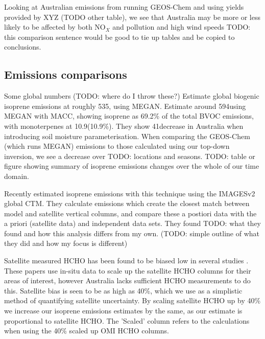         Looking at Australian emissions from running GEOS-Chem and using yields provided by XYZ (TODO other table), we see that Australia may be more or less likely to be affected by both NO$_X$ and pollution and high wind speeds TODO: this comparison sentence would be good to tie up tables and be copied to conclusions.
        
  \subsection{Emissions comparisons}
    \label{BioIsop:Results:Emissions}
  
    Some global numbers (TODO: where do I throw these?)
    \textcite{Guenther2012} Estimate global biogenic isoprene emissions at roughly 535\tgpyr, using MEGAN.
    \textcite{Sindelarova2014} Estimate around 594\tgpyr using MEGAN with MACC, showing isoprene as 69.2\% of the total BVOC emissions, with monoterpenes at 10.9\tgpyr (10.9\%).
    They show 41\tgpyr decrease in Australia when introducing soil moisture parameterisation.
    When comparing the GEOS-Chem (which runs MEGAN) emissions to those calculated using our top-down inversion, we see a decrease over TODO: locations and seasons.
    TODO: table or figure showing summary of isoprene emissions changes over the whole of our time domain.
    
    Recently \textcite{Bauwens2016} estimated isoprene emissions with this technique using the IMAGESv2 global CTM.
    They calculate emissions which create the closest match between model and satellite vertical columns, and compare these a postiori data with the a priori (satellite data) and independent data sets.
    They found TODO: what they found and how this analysis differs from my own.
    (TODO: simple outline of what they did and how my focus is different)
    
    Satellite measured HCHO has been found to be biased low in several studies \parencite[eg.][]{Zhu2016,DeSmedt2015,Barkley2013}.
    These papers use in-situ data to scale up the satellite HCHO columns for their areas of interest, however Australia lacks sufficient HCHO measurements to do this.
    Satellite bias is seen to be as high as 40\%, which we use as a simplistic method of quantifying satellite uncertainty.
    By scaling satellite HCHO up by 40\% we increase our isoprene emissions estimates by the same, as our estimate is proportional to satellite HCHO.
    The 'Scaled' column refers to the calculations when using the 40\% scaled up OMI HCHO columns. %
    

